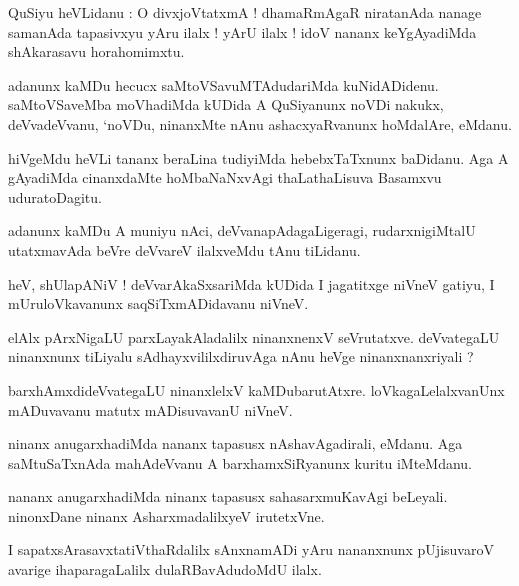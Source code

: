 \documentclass{article}
\begin{document}
\begin{mn}
QuSiyu heVLidanu : O divxjoVtatxmA ! dhamaRmAgaR niratanAda nanage samanAda tapasivxyu yAru ilalx ! 
yArU ilalx ! idoV nananx keYgAyadiMda shAkarasavu horahomimxtu.
\end{mn}

\begin{mn}
adanunx kaMDu hecucx saMtoVSavuMTAdudariMda kuNidADidenu. saMtoVSaveMba moVhadiMda kUDida A 
QuSiyanunx  noVDi nakukx, deVvadeVvanu, `noVDu, ninanxMte nAnu ashacxyaRvanunx hoMdalAre, eMdanu.
\end{mn}

\begin{mn}
hiVgeMdu heVLi tananx beraLina tudiyiMda hebebxTaTxnunx baDidanu. Aga A gAyadiMda cinanxdaMte 
hoMbaNaNxvAgi thaLathaLisuva Basamxvu uduratoDagitu.
\end{mn}

\begin{mn}
adanunx kaMDu A muniyu nAci, deVvanapAdagaLigeragi, rudarxnigiMtalU utatxmavAda beVre deVvareV 
ilalxveMdu tAnu tiLidanu.
\end{mn}

\begin{mn}
heV, shUlapANiV ! deVvarAkaSxsariMda kUDida I jagatitxge niVneV gatiyu, I mUruloVkavanunx 
saqSiTxmADidavanu niVneV.
\end{mn}

\begin{mn}
elAlx pArxNigaLU parxLayakAladalilx ninanxnenxV seVrutatxve. deVvategaLU ninanxnunx tiLiyalu 
sAdhayxvililxdiruvAga nAnu heVge ninanxnanxriyali ?
\end{mn}

\begin{mn}
barxhAmxdideVvategaLU ninanxlelxV kaMDubarutAtxre. loVkagaLelalxvanUnx mADuvavanu matutx 
mADisuvavanU niVneV.
\end{mn}

\begin{mn}
ninanx anugarxhadiMda nananx tapasusx nAshavAgadirali, eMdanu. Aga saMtuSaTxnAda mahAdeVvanu A 
barxhamxSiRyanunx  kuritu iMteMdanu.
\end{mn}

\begin{mn}
nananx anugarxhadiMda ninanx tapasusx sahasarxmuKavAgi beLeyali. ninonxDane ninanx 
AsharxmadalilxyeV irutetxVne.
\end{mn}

\begin{mn}
I sapatxsArasavxtatiVthaRdalilx sAnxnamADi yAru nananxnunx pUjisuvaroV avarige ihaparagaLalilx 
dulaRBavAdudoMdU ilalx.
\end{mn}
\end{document}
